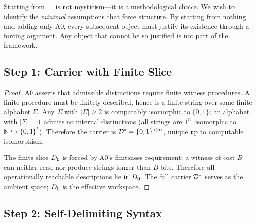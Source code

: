 \begin{remark}
\label{rem:why-nothingness}
Starting from $\bot$ is not mysticism---it is a methodological choice.  We
wish to identify the \emph{minimal} assumptions that force structure.  By
starting from nothing and adding only A0, every subsequent object must
justify its existence through a forcing argument.  Any object that cannot be
so justified is not part of the framework.
\end{remark}


\subsection{Step 1: Carrier with Finite Slice}\label{app:step1}

\begin{proof}
A0 asserts that admissible distinctions require finite witness procedures.
A finite procedure must be finitely described, hence is a finite string
over some finite alphabet $\Sigma$.  Any $\Sigma$ with $|\Sigma| \geq 2$
is computably isomorphic to $\{0,1\}$; an alphabet with $|\Sigma| = 1$
admits no internal distinctions (all strings are $1^n$, isomorphic to
$\mathbb{N} \hookrightarrow \{0,1\}^*$).  Therefore the carrier is
$\mathcal{D}^* = \{0,1\}^{<\infty}$, unique up to computable isomorphism.

The finite slice $D_0$ is forced by A0's finiteness requirement: a
witness of cost $B$ can neither read nor produce strings longer than $B$
bits.  Therefore all operationally reachable descriptions lie in $D_0$.
The full carrier $\mathcal{D}^*$ serves as the ambient space; $D_0$ is the
effective workspace.

\end{proof}


\subsection{Step 2: Self-Delimiting Syntax}\label{app:step2}

